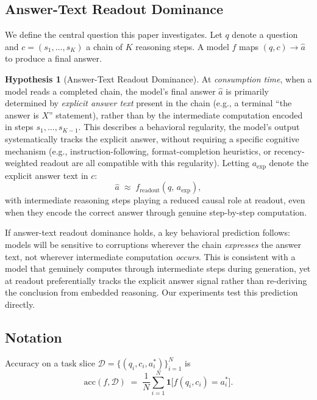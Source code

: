 \documentclass{article}
\theoremstyle{definition}
\theoremstyle{definition}
\newtheorem{hypothesis}{Hypothesis}
\begin{document}
\subsection{Answer-Text Readout Dominance}

We define the central question this paper investigates. Let $q$ denote a
question and $c = (s_1, \ldots, s_K)$ a chain of $K$ reasoning steps. A model
$f$ maps $(q, c) \to \hat{a}$ to produce a final answer.

\begin{hypothesis}[Answer-Text Readout Dominance]
\label{hyp:rationalization}
  At \emph{consumption time}, when a model reads a completed chain, the
  model's final answer $\hat{a}$ is primarily determined by \emph{explicit
  answer text} present in the chain (e.g., a terminal ``the answer is $X$''
  statement), rather than by the intermediate computation encoded in steps
  $s_1, \ldots, s_{K-1}$. This describes a behavioral regularity, the
  model's output systematically tracks the explicit answer, without
  requiring a specific cognitive mechanism (e.g., instruction-following,
  format-completion heuristics, or recency-weighted readout are all
  compatible with this regularity). Letting $a_{\mathrm{exp}}$ denote the
  explicit answer text in $c$:
  \[
    \hat{a} \;\approx\; f_{\mathrm{readout}}(q,\, a_{\mathrm{exp}}),
  \]
  with intermediate reasoning steps playing a reduced causal role at
  readout, even when they encode the correct answer through genuine
  step-by-step computation.
\end{hypothesis}

If answer-text readout dominance holds, a key behavioral
prediction follows: models will be sensitive to corruptions wherever the chain
\emph{expresses} the answer text, not wherever intermediate computation
\emph{occurs}. This is consistent with a model that genuinely computes
through intermediate steps during generation, yet at readout preferentially
tracks the explicit answer signal rather than re-deriving the conclusion from
embedded reasoning. Our experiments test this prediction directly.

\subsection{Notation}

Accuracy on a task slice $\mathcal{D} = \{(q_i, c_i, a_i^*)\}_{i=1}^N$ is
\[
  \mathrm{acc}(f, \mathcal{D}) \;=\;
  \frac{1}{N}\sum_{i=1}^N \mathbf{1}\bigl[f(q_i, c_i) = a_i^*\bigr].
\]
\end{document}

